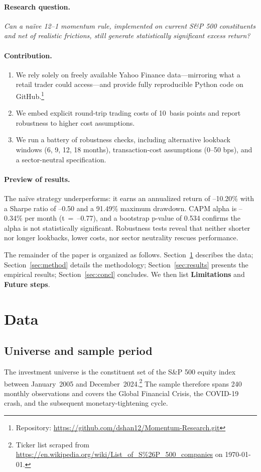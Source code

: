 \documentclass[11pt]{article}
\begin{document}
\paragraph{Research question.}
\emph{Can a naïve 12--1 momentum rule, implemented on current S\&P 500 constituents and net of realistic frictions, still generate statistically significant excess return?}

\paragraph{Contribution.}
\begin{enumerate}[label=(\roman*)]
  \item We rely solely on freely available Yahoo Finance data—mirroring what a retail trader could access—and provide fully reproducible Python code on GitHub.\footnote{Repository: \url{https://github.com/dshan12/Momentum-Research.git}}
  \item We embed explicit round-trip trading costs of 10~basis points and report robustness to higher cost assumptions.
  \item We run a battery of robustness checks, including alternative lookback windows (6, 9, 12, 18 months), transaction-cost assumptions (0–50 bps), and a sector-neutral specification.
\end{enumerate}

\paragraph{Preview of results.}
The naïve strategy underperforms: it earns an annualized return of --10.20\% with a Sharpe ratio of --0.50 and a 91.49\% maximum drawdown.  CAPM alpha is --0.34\% per month (t~=~--0.77), and a bootstrap p-value of 0.534 confirms the alpha is not statistically significant.  Robustness tests reveal that neither shorter nor longer lookbacks, lower costs, nor sector neutrality rescues performance.

The remainder of the paper is organized as follows.  Section~\ref{sec:data} describes the data; Section~\ref{sec:method} details the methodology; Section~\ref{sec:results} presents the empirical results; Section~\ref{sec:concl} concludes. We then list \textbf{Limitations} and \textbf{Future steps}.

\section{Data} \label{sec:data}
\subsection{Universe and sample period}
The investment universe is the constituent set of the S\&P 500 equity index between January~2005 and December~2024.\footnote{Ticker list scraped from \url{https://en.wikipedia.org/wiki/List_of_S\%26P_500_companies} on \today.}
The sample therefore spans 240 monthly observations and covers the Global Financial Crisis, the COVID-19 crash, and the subsequent monetary-tightening cycle.
\end{document}
